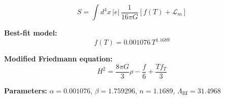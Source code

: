
\begin{equation}
  S = \int d^4x \, |e| \, \frac{1}{16\pi G} \left[ f(T) + \mathcal{L}_m \right]
\end{equation}

\textbf{Best-fit model:}
\begin{equation}
  f(T) = 0.001076 \, T^{1.1689}
\end{equation}

\textbf{Modified Friedmann equation:}
\begin{equation}
  H^2 = \frac{8\pi G}{3} \rho - \frac{f}{6} + \frac{T f_T}{3}
\end{equation}

\textbf{Parameters:}
$\alpha = 0.001076$, \quad
$\beta = 1.759296$, \quad
$n = 1.1689$, \quad
$\Lambda_{\text{BI}} = 31.4968$